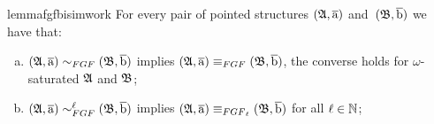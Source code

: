 \ifmainpart
\begin{restatable}{lemma}{fgfbisimwork}\label{lem:FGF-bisimulations-work-well}
For every pair of pointed structures $({\mathfrak{A}}, \overline{\mathrm{a}})$ and~$({\mathfrak{B}}, \overline{\mathrm{b}})$ we have that:
\begin{enumerate}[(a)]
\item $(\str{A}, \elemtuplea) \bisimto_{\FGF} (\str{B}, \elemtupleb)$ implies $(\str{A}, \elemtuplea) \equiv_{\FGF} (\str{B}, \elemtupleb)$, the converse holds for $\omega$-saturated ${\mathfrak{A}}$ and ${\mathfrak{B}}$;
\item $(\str{A}, \elemtuplea) \bisimto_{\FGF}^{\ell} (\str{B}, \elemtupleb)$ implies $(\str{A}, \elemtuplea) \equiv_{\FGF_\ell} (\str{B}, \elemtupleb)$ for all $\ell \in {\mathbb{N}}$;
\end{enumerate}
\end{restatable}
\else
\fi
